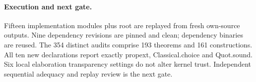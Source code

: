 \documentclass{article}
\begin{document}
\paragraph{Execution and next gate.} Fifteen implementation modules plus root are replayed from fresh own-source outputs. Nine dependency revisions are pinned and clean; dependency binaries are reused. The 354 distinct audits comprise 193 theorems and 161 constructions. All ten new declarations report exactly propext, Classical.choice and Quot.sound. Six local elaboration transparency settings do not alter kernel trust. Independent sequential adequacy and replay review is the next gate.
\end{document}
